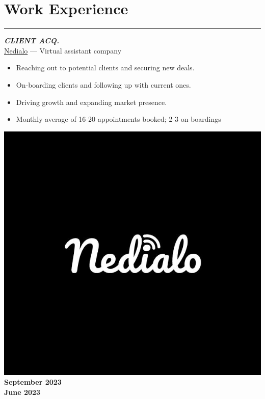 \documentclass[10pt]{article}
\newcommand{\fancy}[1]{\Large\textbf{\textit{#1}}}
\begin{document}

\section*{Work Experience}
\hrule
\vspace{3em}

\begin{minipage}{0.75\textwidth}
 \fancy{CLIENT ACQ.} \\
	{\large \href{https://www.linkedin.com/company/-nedialo/}{Nedialo} --- Virtual assistant company} \\
\begin{itemize}
    \item Reaching out to potential clients and securing new deals.
    \item On-boarding clients and following up with current ones.
    \item Driving growth and expanding market presence.
    \item Monthly average of 16-20 appointments booked; 2-3 on-boardings
\end{itemize}   
\end{minipage}
\hspace{10pt}
\begin{minipage}{0.2\textwidth}
\begin{center}
\vspace{20pt}
\includegraphics[width=\textwidth]{nedialo-black.jpg} \\
    \large\textbf{September 2023\\June 2023} %
\end{center}
\end{minipage} %
\end{document}
